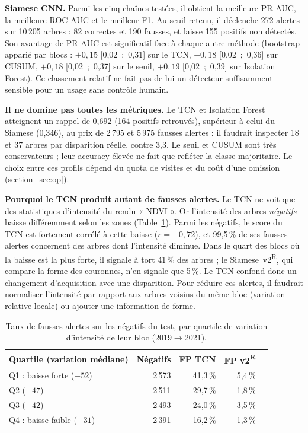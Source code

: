 \documentclass[10pt,a4paper,twocolumn]{article}
\newcommand{\retro}{\textcolor{retro}{\textsuperscript{\textsf{R}}}}
\begin{document}
\textbf{Siamese CNN.} Parmi les cinq chaînes testées, il obtient la meilleure PR-AUC, la meilleure ROC-AUC et le meilleur F1.
Au seuil retenu, il déclenche 272 alertes sur 10\,205 arbres : 82 correctes et 190 fausses, et laisse 155 positifs non détectés.
Son avantage de PR-AUC est significatif face à chaque autre méthode (bootstrap apparié par blocs : $+0{,}15$ [0,02~;~0,31] sur le
TCN, $+0{,}18$ [0,02~;~0,36] sur CUSUM, $+0{,}18$ [0,02~;~0,37] sur le seuil, $+0{,}19$ [0,02~;~0,39] sur Isolation Forest).
Ce classement relatif ne fait pas de lui un détecteur suffisamment sensible pour un usage sans contrôle humain.

\textbf{Il ne domine pas toutes les métriques.} Le TCN et Isolation Forest atteignent un rappel de 0,692 (164 positifs
retrouvés), supérieur à celui du Siamese (0,346), au prix de 2\,795 et 5\,975 fausses alertes : il faudrait inspecter 18 et
37 arbres par disparition réelle, contre 3,3. Le seuil et CUSUM sont très conservateurs ; leur accuracy élevée ne fait que
refléter la classe majoritaire. Le choix entre ces profils dépend du quota de visites et du coût d'une omission
(section~\ref{sec:op}).

\textbf{Pourquoi le TCN produit autant de fausses alertes.}
\label{sec:fp}
Le TCN ne voit que des statistiques d'intensité du rendu « NDVI ». Or l'intensité des arbres \emph{négatifs} baisse
différemment selon les zones (Table~\ref{tab:fp}). Parmi les négatifs, le score du TCN est fortement corrélé à cette baisse
($r=-0{,}72$), et 99,5\,\% de ses fausses alertes concernent des arbres dont l'intensité diminue. Dans le quart des blocs où
la baisse est la plus forte, il signale à tort 41\,\% des arbres ; le Siamese~v2\retro{}, qui compare la forme des couronnes,
n'en signale que 5\,\%. Le TCN confond donc un changement d'acquisition avec une disparition. Pour réduire ces alertes, il
faudrait normaliser l'intensité par rapport aux arbres voisins du même bloc (variation relative locale) ou ajouter une
information de forme.

\begin{table}[t]
\centering\small
\caption{Taux de fausses alertes sur les négatifs du test, par quartile de variation d'intensité de leur bloc (2019$\to$2021).}
\label{tab:fp}
\setlength{\tabcolsep}{3.5pt}
\begin{tabular}{@{}lrrrr@{}}
\toprule
Quartile (variation médiane) & Négatifs & FP TCN & FP v2\retro{} \\
\midrule
Q1 : baisse forte ($-52$) & 2\,573 & 41,3\,\% & 5,4\,\% \\
Q2 ($-47$) & 2\,511 & 29,7\,\% & 1,8\,\% \\
Q3 ($-42$) & 2\,493 & 24,0\,\% & 3,5\,\% \\
Q4 : baisse faible ($-31$) & 2\,391 & 16,2\,\% & 1,3\,\% \\
\bottomrule
\end{tabular}
\end{table}
\end{document}
